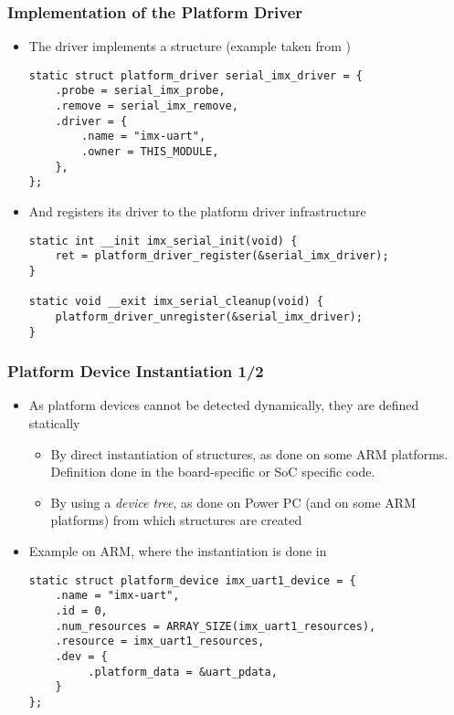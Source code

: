\begin{frame}[fragile]
  \frametitle{Implementation of the Platform Driver}
  \begin{itemize}
  \item The driver implements a 
    structure (example taken from )
    \begin{verbatim}
static struct platform_driver serial_imx_driver = {
    .probe = serial_imx_probe,
    .remove = serial_imx_remove,
    .driver = {
        .name = "imx-uart",
        .owner = THIS_MODULE,
    },
};
    \end{verbatim}
\item And registers its driver to the platform driver infrastructure
  \begin{verbatim}
static int __init imx_serial_init(void) {
    ret = platform_driver_register(&serial_imx_driver);
}

static void __exit imx_serial_cleanup(void) {
    platform_driver_unregister(&serial_imx_driver);
}
  \end{verbatim}
\end{itemize}
\end{frame}

\begin{frame}[fragile]
  \frametitle{Platform Device Instantiation 1/2}
  \begin{itemize}
  \item As platform devices cannot be detected dynamically, they are
    defined statically
    \begin{itemize}
    \item By direct instantiation of 
      structures, as done on some ARM platforms. Definition done in
      the board-specific or SoC specific code.
    \item By using a \emph{device tree}, as done on Power PC (and on
      some ARM platforms) from which 
      structures are created
    \end{itemize}
  \item Example on ARM, where the instantiation is done in
\begin{verbatim}
static struct platform_device imx_uart1_device = {
    .name = "imx-uart",
    .id = 0,
    .num_resources = ARRAY_SIZE(imx_uart1_resources),
    .resource = imx_uart1_resources,
    .dev = {
         .platform_data = &uart_pdata,
    }
};
\end{verbatim}
\end{itemize}
\end{frame}

